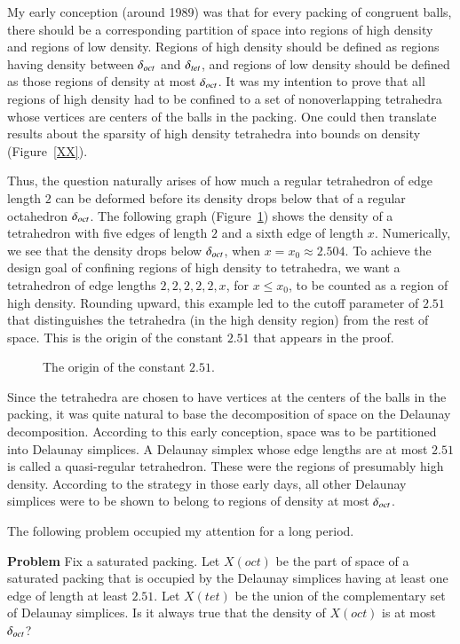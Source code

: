 My early conception (around 1989) was that for every packing of
congruent balls, there should be a corresponding partition of space
into regions of high density and regions of low density. Regions of
high density should be defined as regions having density between
$\delta_{oct}$ and $\delta_{tet}$, and regions of low density should be defined as
those regions of density at most $\delta_{oct}$.  It was my intention to
prove that all regions of high density had to be confined to a set
of nonoverlapping tetrahedra whose vertices are centers of the balls
in the packing.  One could then translate results about the sparsity
of high density tetrahedra into bounds on density 
(Figure~\ref{XX}). %


Thus, the question naturally arises of how much a regular
tetrahedron of edge length $2$ can be deformed before its density
drops below that of a regular octahedron $\delta_{oct}$.  The following
graph (Figure~\ref{fig:t51}) shows the density of a tetrahedron with
five edges of length $2$ and a sixth edge of length $x$.
Numerically, we see that the density drops below $\delta_{oct}$, when
$x=x_0\approx 2.504$. To achieve the design goal of confining
regions of high density to tetrahedra, we want a tetrahedron of edge
lengths $2,2,2,2,2,x$, for $x\le x_0$, to be counted as a region of
high density. Rounding upward, this example led to the cutoff
parameter of $2.51$ that distinguishes the tetrahedra (in the high
density region) from the rest of space. This is the origin of the
constant $2.51$ that appears in the proof.


\begin{figure}[htb]
  \centering
  \caption{The origin of the constant $2.51$.}
  \label{fig:t51}
\end{figure}

Since the tetrahedra are chosen to have vertices at the centers of
the balls in the packing, it was quite natural to base the
decomposition of space on the Delaunay decomposition. According to
this early conception, space was to be partitioned into Delaunay
simplices.  A Delaunay simplex whose edge lengths are at most
$2.51$ is called a quasi-regular tetrahedron.  These were the
regions of presumably high density.  According to the strategy in
those early days, all other Delaunay simplices were to be shown to
belong to regions of density at most $\delta_{oct}$.

The following problem occupied my attention for a long period.


\smallskip\noindent
{\bf Problem} Fix a saturated packing. Let $X(oct)$ be the part of
space of a saturated packing that is occupied by the Delaunay
simplices having at least one edge of length at least $2.51$.  Let
$X(tet)$ be the union of the complementary set of Delaunay
simplices.  Is it always true that the density of $X(oct)$ is at
most $\delta_{oct}$?

